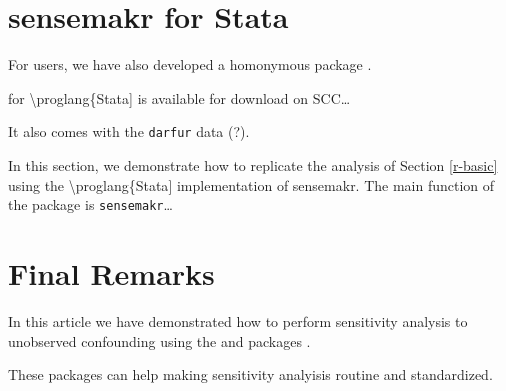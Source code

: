 \documentclass[
]{jss}
\begin{document}
\hypertarget{stata}{%
\section{sensemakr for Stata}\label{stata}}

For  users, we have also developed a homonymous package
.

 for \textbackslash proglang\{Stata{]} is available for
download on SCC\ldots{}

It also comes with the \texttt{darfur} data (?).

In this section, we demonstrate how to replicate the analysis of Section
\ref{r-basic} using the \textbackslash proglang\{Stata{]} implementation
of sensemakr. The main function of the  package is
\texttt{sensemakr}\ldots{}

\hypertarget{final-remarks}{%
\section{Final Remarks}\label{final-remarks}}

In this article we have demonstrated how to perform sensitivity analysis
to unobserved confounding using the  and 
packages .

These packages can help making sensitivity analyisis routine and
standardized.

\renewcommand\refname{References}

\end{document}
